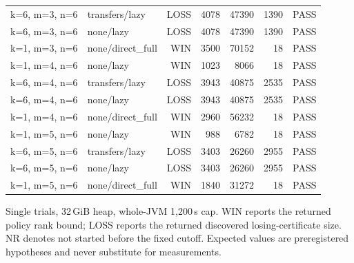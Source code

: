 \begin{longtable}{llrrrrl}
k=6, m=3, n=6 & transfers/lazy & LOSS & 4078 & 47390 & 1390 & PASS \\
k=6, m=3, n=6 & none/lazy & LOSS & 4078 & 47390 & 1390 & PASS \\
k=1, m=3, n=6 & none/direct\_full & WIN & 3500 & 70152 & 18 & PASS \\
k=1, m=4, n=6 & none/lazy & WIN & 1023 & 8066 & 18 & PASS \\
k=6, m=4, n=6 & transfers/lazy & LOSS & 3943 & 40875 & 2535 & PASS \\
k=6, m=4, n=6 & none/lazy & LOSS & 3943 & 40875 & 2535 & PASS \\
k=1, m=4, n=6 & none/direct\_full & WIN & 2960 & 56232 & 18 & PASS \\
k=1, m=5, n=6 & none/lazy & WIN & 988 & 6782 & 18 & PASS \\
k=6, m=5, n=6 & transfers/lazy & LOSS & 3403 & 26260 & 2955 & PASS \\
k=6, m=5, n=6 & none/lazy & LOSS & 3403 & 26260 & 2955 & PASS \\
k=1, m=5, n=6 & none/direct\_full & WIN & 1840 & 31272 & 18 & PASS \\
\bottomrule
\end{longtable}
{\par\smallskip\footnotesize Single trials, 32\,GiB heap, whole-JVM 1,200\,s cap. WIN reports the returned policy rank bound; LOSS reports the returned discovered losing-certificate size. NR denotes not started before the fixed cutoff. Expected values are preregistered hypotheses and never substitute for measurements.}
